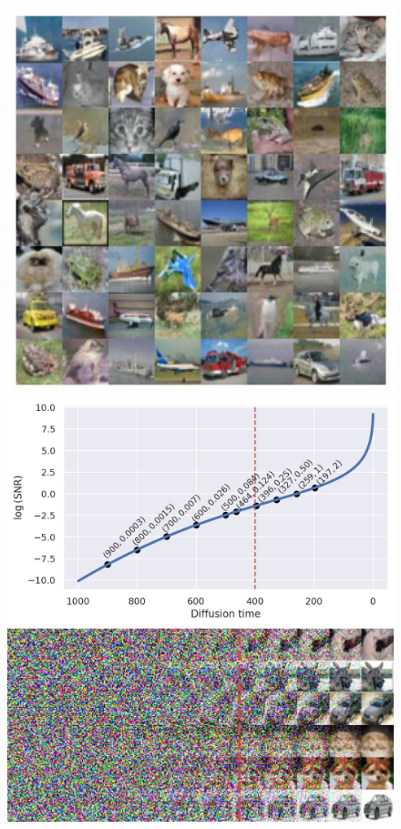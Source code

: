 \begin{figure}[ht!]
\endminipage\hfill
{}
  \includegraphics[width=\linewidth]{figs/imgs/ddpm_cifar10_data_samples_T_500.jpg}
\endminipage\hfill
{}
  \includegraphics[width=\linewidth]{figs/plots/log_snr_analysis_vp_extended.png}
\endminipage\hfill
{}
    \includegraphics[width=\linewidth]{figs/imgs/cifar10_progressive_generation.jpg}

\end{figure}
